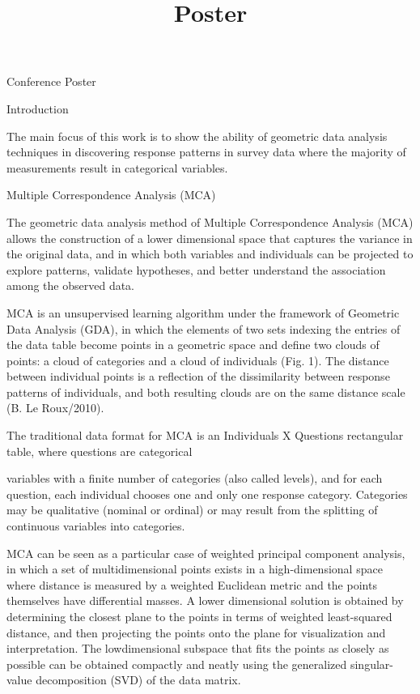 \documentclass[]{article}
\title{Poster}
\author{}
\date{}
\begin{document}
\maketitle

Conference Poster

Introduction

The main focus of this work is to show the ability of geometric data
analysis techniques in discovering response patterns in survey data
where the majority of measurements result in categorical variables.

Multiple Correspondence Analysis (MCA)

The geometric data analysis method of Multiple Correspondence Analysis
(MCA) allows the construction of a lower dimensional space that captures
the variance in the original data, and in which both variables and
individuals can be projected to explore patterns, validate hypotheses,
and better understand the association among the observed data.

MCA is an unsupervised learning algorithm under the framework of
Geometric Data Analysis (GDA), in which the elements of two sets
indexing the entries of the data table become points in a geometric
space and define two clouds of points: a cloud of categories and a cloud
of individuals (Fig. 1). The distance between individual points is a
reflection of the dissimilarity between response patterns of
individuals, and both resulting clouds are on the same distance scale
(B. Le Roux/2010).

The traditional data format for MCA is an Individuals X Questions
rectangular table, where questions are categorical

variables with a finite number of categories (also called levels), and
for each question, each individual chooses one and only one response
category. Categories may be qualitative (nominal or ordinal) or may
result from the splitting of continuous variables into categories.

MCA can be seen as a particular case of weighted principal component
analysis, in which a set of multidimensional points exists in a
high-dimensional space where distance is measured by a weighted
Euclidean metric and the points themselves have differential masses. A
lower dimensional solution is obtained by determining the closest plane
to the points in terms of weighted least-squared distance, and then
projecting the points onto the plane for visualization and
interpretation. The lowdimensional subspace that fits the points as
closely as possible can be obtained compactly and neatly using the
generalized singular-value decomposition (SVD) of the data matrix.
\end{document}
